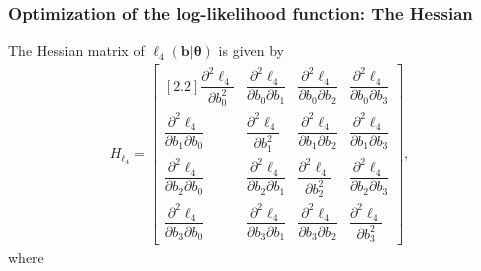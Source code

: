 \documentclass[11pt, letterpaper]{article}
\numberwithin{equation}{section}
\begin{document}
\subsubsection{Optimization of the log-likelihood function: The Hessian}
The Hessian matrix of $\ell_4(\bm b | \bm \theta)$ is given by
\begin{align*}
H_{\ell_4} = \begin{bmatrix}[2.2]
\dfrac{\partial^2 \ell_4}{\partial b_0 ^2} & \dfrac{\partial^2 \ell_4}{\partial b_0 \partial b_1} & \dfrac{\partial^2 \ell_4}{\partial b_0 \partial b_2} & \dfrac{\partial^2 \ell_4}{\partial b_0 \partial b_3} \\
\dfrac{\partial^2 \ell_4}{\partial b_1  \partial b_0} & \dfrac{\partial^2 \ell_4}{\partial b_1^2} & \dfrac{\partial^2 \ell_4}{\partial b_1 \partial b_2} & \dfrac{\partial^2 \ell_4}{\partial b_1 \partial b_3}\\
\dfrac{\partial^2 \ell_4}{\partial b_2  \partial b_0}  & \dfrac{\partial^2 \ell_4}{\partial b_2 \partial b_1} & \dfrac{\partial^2 \ell_4}{\partial b_2^2} & \dfrac{\partial^2 \ell_4}{\partial b_2 \partial b_3}\\
\dfrac{\partial^2 \ell_4}{\partial b_3  \partial b_0}  & \dfrac{\partial^2 \ell_4}{\partial b_3 \partial b_1} & \dfrac{\partial^2 \ell_4}{\partial b_3 \partial b_2} & \dfrac{\partial^2 \ell_4}{\partial b_3^2}
\end{bmatrix},
\end{align*}
where
\end{document}
